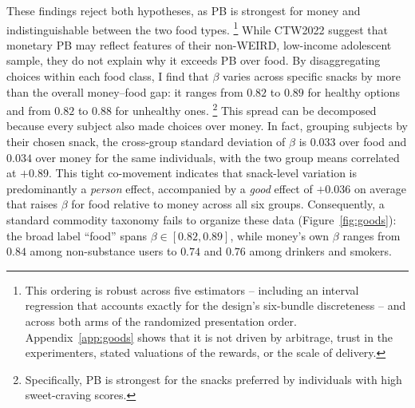 \documentclass[11pt,a4paper]{article}
\theoremstyle{plain}
\theoremstyle{definition}
\begin{document}
\noindent
These findings reject both hypotheses, as PB is strongest for money and indistinguishable between the two food types.%
\footnote{This ordering is robust across five estimators -- including an interval regression that accounts exactly for the design's six-bundle discreteness -- and across both arms of the randomized presentation order. 
Appendix~\ref{app:goods} shows that it is not driven by arbitrage, trust in the experimenters, stated valuations of the rewards, or the scale of delivery. 
}
While CTW2022 suggest that monetary PB may reflect features of their non-WEIRD, low-income adolescent sample, they do not explain why it exceeds PB over food.
By disaggregating choices within each food class, I find that $\beta$ varies across specific snacks by more than the overall money--food gap: it ranges from $0.82$ to $0.89$ for healthy options and from $0.82$ to $0.88$ for unhealthy ones.%
\footnote{Specifically, PB is strongest for the snacks preferred by individuals with high sweet-craving scores.} 
This spread can be decomposed because every subject also made choices over money. In fact, grouping subjects by their chosen snack, the cross-group standard deviation of $\beta$ is $0.033$ over food and $0.034$ over money for the same individuals, with the two group means correlated at $+0.89$. This tight co-movement indicates that snack-level variation is predominantly a \emph{person} effect, %
accompanied by a \emph{good} effect of $+0.036$ on average that raises $\beta$ for food relative to money across all six groups.
Consequently, a standard commodity taxonomy fails to organize these data (Figure~\ref{fig:goods}): the broad label ``food'' spans $\beta \in [0.82, 0.89]$, while money's own $\beta$ ranges from $0.84$ among non-substance users to $0.74$ and $0.76$ among drinkers and smokers.
\end{document}

